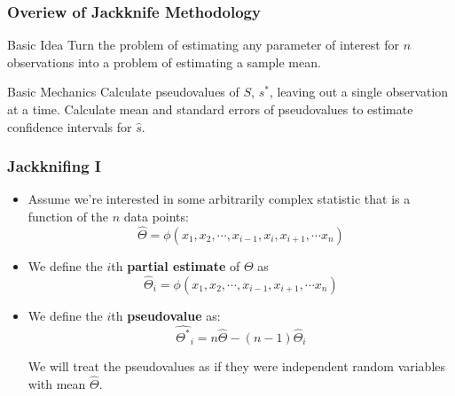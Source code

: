 \documentclass{beamer}
\begin{document}
\begin{frame}
  \frametitle{Overiew of Jackknife Methodology}

\begin{block}{Basic Idea}
Turn the problem of estimating any parameter of interest for $n$ observations into a problem of estimating a sample mean.
\end{block}

\begin{block}{Basic Mechanics}
Calculate pseudovalues of $S$, $s^*$, leaving out a single observation at a time. Calculate mean and standard errors of pseudovalues to estimate confidence intervals for $\widehat{s}$.

\end{block}




\end{frame}










\begin{frame}
  \frametitle{Jackknifing I}

\begin{itemize}
    \item Assume we're interested in some arbitrarily complex statistic that is a function of the $n$ data points:
\[
\widehat{\Theta} = \phi(x_1, x_2, \cdots, x_{i-1}, x_i, x_{i+1}, \cdots x_n)
\]

    \item We define the $i$th \textbf{partial estimate} of $\Theta$ as
\[
\widehat{\Theta}_i = \phi(x_1, x_2, \cdots, x_{i-1}, x_{i+1}, \cdots x_n)
\]

    \item We define the $i$th \textbf{pseudovalue} as:
\[
\widehat{\Theta^*}_i = n \widehat{\Theta} - (n-1)\widehat{\Theta}_i
\]

We will treat the pseudovalues as if they were independent random variables with mean $\widehat{\Theta}$.


\end{itemize}

\end{frame}
\end{document}
